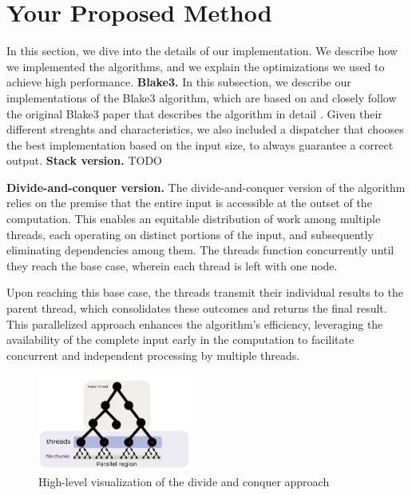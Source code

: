 \documentclass[letterpaper]{article}
\newcommand{\mypar}[1]{{\bf #1.}}
\begin{document}
\section{Your Proposed Method}\label{sec:yourmethod}
In this section, we dive into the details of our implementation. We describe how we implemented the algorithms,
and we explain the optimizations we used to achieve high performance.
%
%
\mypar{Blake3}
In this subsection, we describe our implementations of the Blake3 algorithm, which are based on and closely follow the original Blake3 paper that describes the algorithm in detail \cite{blake}.
Given their different strenghts and characteristics, we also included a dispatcher that chooses the best implementation based on the input size, to always guarantee a correct output.
\mypar{Stack version}
TODO

\mypar{Divide-and-conquer version}
The divide-and-conquer version of the algorithm relies on the premise that the entire input is accessible at the outset of the computation. This enables an equitable distribution of work among multiple threads, each operating on distinct portions of the input, and subsequently eliminating dependencies among them. The threads function concurrently until they reach the base case, wherein each thread is left with one node.

Upon reaching this base case, the threads transmit their individual results to the parent thread, which consolidates these outcomes and returns the final result. This parallelized approach enhances the algorithm's efficiency, leveraging the availability of the complete input early in the computation to facilitate concurrent and independent processing by multiple threads.
\begin{figure}[h]
	\begin{center}
		\includegraphics[width=0.45\textwidth]{figures/div_conq.png}
	\end{center}
	\caption{High-level visualization of the divide and conquer approach}\label{fig:divide_and_conquer}
\end{figure}
\end{document}
